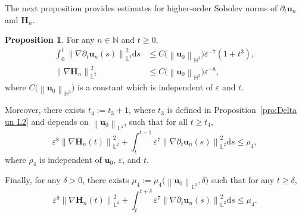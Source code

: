 \documentclass[11pt, reqno]{amsart}
\theoremstyle{definition}
\newtheorem{proposition}[theorem]{Proposition}
\numberwithin{equation}{section}
\newcommand{\bff}{\boldsymbol}
\newcommand{\bb}{\mathbb}
\newcommand{\ds}{\mathrm{d}s}
\newcommand{\norm}[2]{\left\|{#1}\right\|_{#2}}
\begin{document}
The next proposition provides estimates for higher-order Sobolev norms of $\partial_t \bff{u}_n$ and $\bff{H}_n$.

\begin{proposition}\label{pro:nabla pa t un}
For any $n\in\bb{N}$ and $t\geq 0$,
\begin{align}
    \label{equ:dt nab int L2}
    \int_0^t \norm{\nabla \partial_t \bff{u}_n(s)}{\bb{L}^2}^2 \ds
    &\leq
    C \big(\norm{\bff{u}_0}{\bb{H}^3}\big) \varepsilon^{-7} \left(1+t^3 \right),
    \\
    \label{equ:varep nab Hn}
    \norm{\nabla \bff{H}_n}{\bb{L}^2}^2
    &\leq
    C \big(\norm{\bff{u}_0}{\bb{H}^3}\big) \varepsilon^{-8}, 
\end{align}
where $C \big(\norm{\bff{u}_0}{\bb{H}^3}\big)$ is a constant which is independent of $\varepsilon$ and $t$.

Moreover, there exists $t_4:=t_3+1$, where $t_3$ is defined in Proposition~\ref{pro:Delta un L2} and depends on $\norm{\bff{u}_0}{\bb{L}^2}$, such that for all $t\geq t_4$,
\begin{equation}\label{equ:rho3 nab Hn}
    \varepsilon^{8} \norm{\nabla \bff{H}_n(t)}{\bb{L}^2}^2 
    +
    \int_t^{t+1} \varepsilon^7 \norm{\nabla \partial_t \bff{u}_n(s)}{\bb{L}^2}^2 \ds
    \leq
    \rho_4,
\end{equation}
where $\rho_4$ is independent of $\bff{u}_0$, $\varepsilon$, and $t$.

Finally, for any $\delta>0$, there exists $\mu_4:= \mu_4\big(\norm{\bff{u}_0}{\bb{L}^2}, \delta\big)$ such that for any $t\geq \delta$,
\begin{equation}\label{equ:mu3 nab Hn}
    \varepsilon^{8} \norm{\nabla \bff{H}_n(t)}{\bb{L}^2}^2 
    +
    \int_t^{t+\delta} \varepsilon^7 \norm{\nabla \partial_t \bff{u}_n(s)}{\bb{L}^2}^2 \ds
    \leq
    \mu_4.
\end{equation}
\end{proposition}
\end{document}
